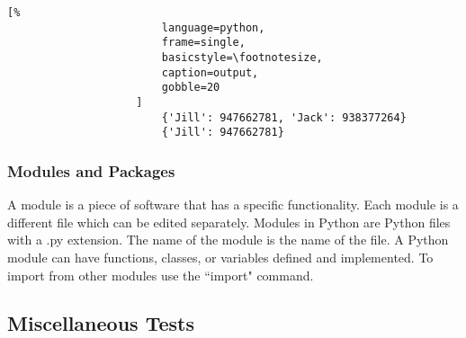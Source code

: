 \documentclass[crop=false,class=book,oneside]{standalone}
\begin{document}
                \begin{minipage}[t]{.48\textwidth}
                    \centering
                    \begin{lstlisting}[%
                        language=python,
                        frame=single,
                        basicstyle=\footnotesize,
                        caption=output,
                        gobble=20
                    ]
                        {'Jill': 947662781, 'Jack': 938377264}
                        {'Jill': 947662781}
                    \end{lstlisting}
                \end{minipage}
            \subsubsection{Modules and Packages}
            A module is a piece of software that has a specific
            functionality. Each module is a different file which can be
            edited separately. Modules in Python are Python files with a
            .py extension. The name of the module is the name of the
            file. A Python module can have functions, classes, or
            variables defined and implemented. To import from other
            modules use the ``import" command.
        \subsection{Miscellaneous Tests}
\end{document}

